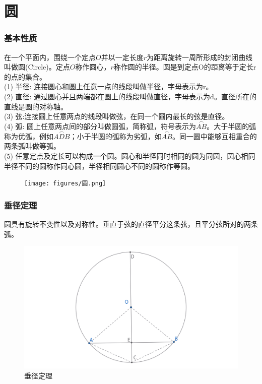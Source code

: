 \part{圆}
\section{基本性质}
\begin{definition}[圆]
    在一个平面内，围绕一个定点$O$并以一定长度$r$为距离旋转一周所形成的封闭曲线叫做圆(Circle)。定点$O$称作圆心，$r$称作圆的半径。圆是到定点O的距离等于定长r的点的集合。\\
    (1) 半径: 连接圆心和圆上任意一点的线段叫做半径，字母表示为r。\\
    (2) 直径: 通过圆心并且两端都在圆上的线段叫做直径，字母表示为d。直径所在的直线是圆的对称轴。\\
    (3) 弦:连接圆上任意两点的线段叫做弦，在同一个圆内最长的弦是直径。\\
    (4) 弧: 圆上任意两点间的部分叫做圆弧，简称弧，符号表示为$\overset{\frown}{AB}$。大于半圆的弧称为优弧，例如$\overset{\frown}{ADB}$；小于半圆的弧称为劣弧，如$\overset{\frown}{AB}$。同一圆中能够互相重合的两条弧叫做等弧。\\
    (5) 任意定点及定长可以构成一个圆。圆心和半径同时相同的圆为同圆，圆心相同半径不同的圆称作同心圆，半径相同圆心不同的圆称作等圆。\\
\end{definition}

\begin{figure}[H]
    \centering
    \texttt{[image: figures/圆.png]}
\end{figure}


\section{垂径定理}
\begin{theorem}[垂径定理]
圆具有旋转不变性以及对称性。垂直于弦的直径平分这条弦，且平分弦所对的两条弧。
\end{theorem}
\begin{figure}[H]
    \centering
    \includegraphics[width=\linewidth]{figures/垂径定理.png}
    \caption{垂径定理}
\end{figure}



